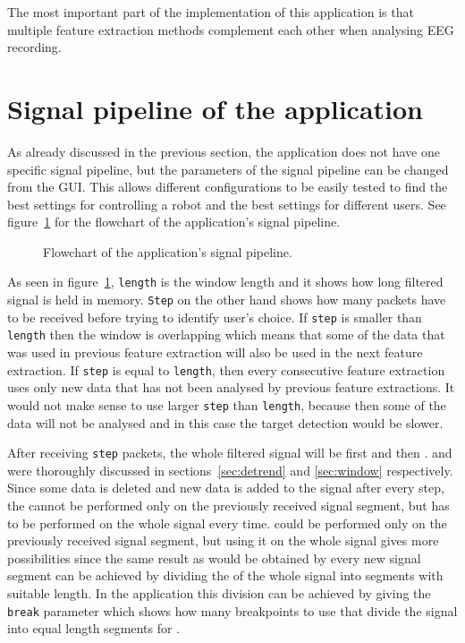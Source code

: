 The most important part of the implementation of this application is that multiple \gls{feature extraction} methods complement each other when analysing \gls{EEG} recording.

\section{Signal pipeline of the application}
\label{sec:signal_pipeline}

As already discussed in the previous section, the application does not have one specific signal pipeline, but the parameters of the signal pipeline can be changed from the \gls{GUI}. This allows different configurations to be easily tested to find the best settings for controlling a robot and the best settings for different users. See figure~\ref{fig:signal_pipeline} for the flowchart of the application's signal pipeline.

\begin{figure}[h!]
	\centering
	
	\caption{Flowchart of the application's signal pipeline.}
	\label{fig:signal_pipeline}
\end{figure}

As seen in figure~\ref{fig:signal_pipeline}, \texttt{length} is the \gls{window} length and it shows how long filtered signal is held in memory. \texttt{Step} on the other hand shows how many packets have to be received before trying to identify user's choice. If \texttt{step} is smaller than \texttt{length} then the \gls{window} is overlapping which means that some of the data that was used in previous \gls{feature extraction} will also be used in the next \gls{feature extraction}. If \texttt{step} is equal to \texttt{length}, then every consecutive \gls{feature extraction} uses only new data that has not been analysed by previous \glspl{feature extraction}. It would not make sense to use larger \texttt{step} than \texttt{length}, because then some of the data will not be analysed and in this case the \gls{target} detection would be slower.

After receiving \texttt{step} packets, the whole filtered signal will be first  and then .  and  were thoroughly discussed in sections~\ref{sec:detrend} and \ref{sec:window} respectively. Since some data is deleted and new data is added to the signal after every step, the  cannot be performed only on the previously received signal segment, but has to be performed on the whole signal every time.  could be performed only on the previously received signal segment, but using it on the whole signal gives more possibilities since the same result as would be obtained by  every new signal segment can be achieved by dividing the  of the whole signal into segments with suitable length. In the application this division can be achieved by giving the \texttt{break} parameter which shows how many breakpoints to use that divide the signal into equal length segments for .

